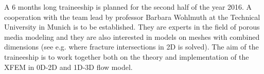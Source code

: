 \documentclass[bibliography=totocnumbered,dvipsnames,FM,Dis,EN]{tulthesis}
\begin{document}

A 6 months long traineeship is planned for the second half of the year 2016. A cooperation with the team lead
by professor Barbara Wohlmuth at the Technical University in Munich is to be established. They are experts
in the field of porous media modeling and they are also interested in models on meshes with combined dimensions
(see e.g. \cite{schwenck_2015} where fracture intersections in 2D is solved). The aim of the traineeship is to
work together both on the theory and implementation of the XFEM in 0D-2D and 1D-3D flow model.



{\small

% 

}
\end{document}
